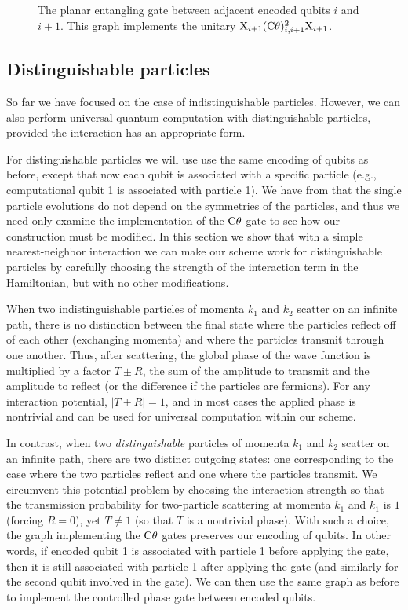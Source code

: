 \documentclass[../thesis-main/thesis-main]{subfiles}
\begin{document}
\begin{figure}
\centering
     
\caption[Planar entangling gate]{The planar entangling gate between adjacent encoded qubits $i$ and $i+1$. This graph implements the unitary $\mathrm{X}_{i+1} (\mathrm{C}\theta)^2_{i,i+1} \mathrm{X}_{i+1}$.}
\label{fig:PlanCPGate}
\end{figure}

\subsection{Distinguishable particles}

So far we have focused on the case of indistinguishable particles.  However, we can also perform universal quantum computation with distinguishable particles, provided the interaction has an appropriate form.

For distinguishable particles we will use use the same encoding of qubits as before, except that now each qubit is associated with a specific particle (e.g., computational qubit 1 is associated with particle 1). We have from  that the single particle evolutions do not depend on the symmetries of the particles, and thus we need only examine the implementation of the $\mathrm{C}\theta$ gate to see how our construction must be modified. In this section we show that with a simple nearest-neighbor interaction we can make our scheme work for distinguishable particles by carefully choosing the strength of the interaction term in the Hamiltonian, but with no other modifications.

When two indistinguishable particles of momenta $k_1$ and $k_2$ scatter on an infinite path, there is no distinction between the final state where the particles reflect off of each other (exchanging momenta) and where the particles transmit through one another. Thus, after scattering, the global phase of the wave function is multiplied by a factor $T\pm R$, the sum of the amplitude to transmit and the amplitude to reflect (or the difference if the particles are fermions). For any interaction potential, $|T\pm R|=1$, and in most cases the applied phase is nontrivial and can be used for universal computation within our scheme. 

In contrast, when two \textit{distinguishable} particles of momenta $k_1$ and $k_2$ scatter on an infinite path, there are two distinct outgoing states:  one corresponding to the case where the two particles reflect and one where the particles transmit.  We circumvent this potential problem by choosing the interaction strength so that the transmission probability for two-particle scattering at momenta $k_1$ and $k_1$ is $1$ (forcing $R=0$), yet $T\neq 1$ (so that $T$ is a nontrivial phase). With such a choice, the graph implementing the $\mathrm{C}\theta$ gates preserves our encoding of qubits. In other words, if encoded qubit 1 is associated with particle 1 before applying the gate, then it is still associated with particle 1 after applying the gate (and similarly for the second qubit involved in the gate). We can then use the same graph as before to implement the controlled phase gate between encoded qubits.
\end{document}
